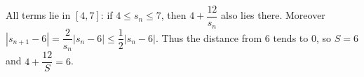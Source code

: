 All terms lie in $[4,7]$: if $4\le s_n\le7$, then $4+\dfrac{12}{s_n}$ also lies there. Moreover $|s_{n+1}-6|=\dfrac{2}{s_n}|s_n-6|\le\dfrac{1}{2}|s_n-6|$. Thus the distance from 6 tends to 0, so $S=6$ and $4+\dfrac{12}{S}=\boxed6$.
